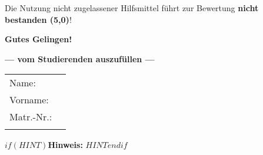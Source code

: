 \begin{coverpages}
\begin{minipage}[c]{0.5\textwidth}
\begin{minipage}[c]{0.96\textwidth}
{            Die Nutzung nicht zugelassener Hilfsmittel führt zur Bewertung
            \textbf{nicht bestanden (5,0)}!}

            \bigskip
            \medskip
            \textbf{Gutes Gelingen!}
            \smallskip
            \vspace{2mm}
        \end{minipage}
    \end{minipage}
    \vrule
    \begin{minipage}[c]{0.5\textwidth}
        \bigskip
        \begin{center}
            \textcolor{headcolor}
            {\textbf{--- vom Studierenden auszufüllen ---}} \\[6mm]
        \end{center}
        \begin{center}
            \renewcommand{\arraystretch}{1.5}
            \begin{tabular}{@{\bfseries}lp{5cm}}
                Name:     & \dotfill \\[1mm]
                Vorname:  & \dotfill \\[1mm]
                Matr.-Nr.:& \dotfill \\[6mm]

                \multicolumn{2}{l}{\begin{minipage}[c]{76mm}
                \end{minipage}
                }\\[22mm]

            \end{tabular}
        \end{center}
        \smallskip
    \end{minipage}
    \par\hrulefill\par
    \vspace{10mm}
    $if(HINT)$\textbf{Hinweis:} $HINT$$endif$
    \vspace{10mm}


\end{coverpages}
